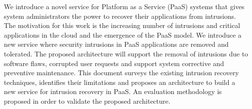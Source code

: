 We introduce a novel service for Platform as a Service (PaaS) systems that gives system administrators the power to recover their applications from intrusions. The motivation for this work is the increasing number of intrusions and critical applications in the cloud and the emergence of the PaaS model. We introduce a new service where security intrusions in PaaS applications are removed and tolerated. The proposed architecture will support the removal of intrusions due to software flaws, corrupted user requests and support system corrective and preventive maintenance. This document surveys the existing intrusion recovery techniques, identifies their limitations and proposes an architecture to build a new service for intrusion recovery in PaaS. An evaluation methodology is proposed in order to validate the proposed architecture.
